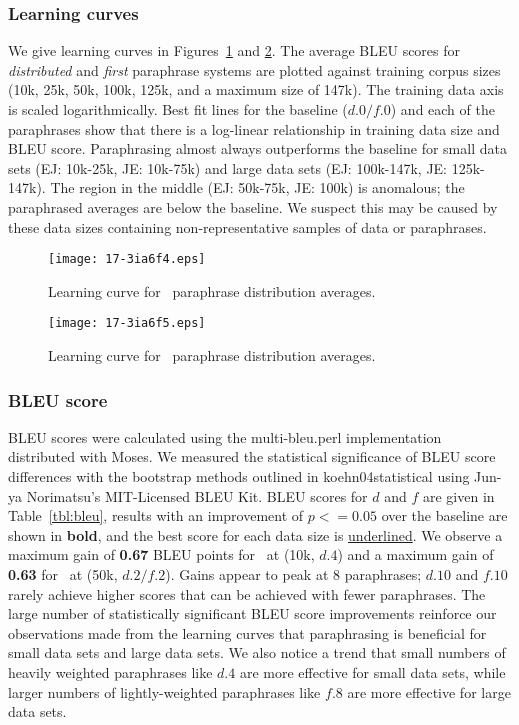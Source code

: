 \documentclass[english]{jnlp_1.4}
\newcommand{\citet}{}
\newcommand{\JE}{}
\newcommand{\EJ}{}
\begin{document}
\subsubsection{Learning curves}

We give learning curves in Figures~\ref{fig:curve-EJ} and
\ref{fig:curve-JE}.
The average BLEU scores for {\it distributed} and {\it first}
paraphrase systems are plotted against training corpus sizes (10k,
25k, 50k, 100k, 125k, and a maximum size of 147k). The training data
axis is scaled logarithmically. Best fit lines for the baseline
($d.0/f.0$) and each of the paraphrases show that there is a
log-linear relationship in training data size and BLEU
score. Paraphrasing almost always outperforms the baseline for small
data sets (EJ: 10k-25k, JE: 10k-75k) and large data sets (EJ:
100k-147k, JE: 125k-147k).  The region in the middle (EJ: 50k-75k, JE:
100k) is anomalous; the paraphrased averages are below the
baseline. We suspect this may be caused by these data sizes containing
non-representative samples of data or paraphrases.


\begin{figure}[p]
\begin{center}
\texttt{[image: 17-3ia6f4.eps]}
\end{center}
  \caption{Learning curve for \EJ\ paraphrase distribution averages.}
  \label{fig:curve-EJ}
\end{figure}
\begin{figure}[p]
\begin{center}
\texttt{[image: 17-3ia6f5.eps]}
\end{center}
  \caption{Learning curve for \JE\ paraphrase distribution averages.}
  \label{fig:curve-JE}
\end{figure}

\subsubsection{BLEU score}

    BLEU scores were calculated using the multi-bleu.perl
implementation distributed with Moses.  We measured the statistical
significance of BLEU score differences with the bootstrap methods
outlined in \citet{koehn04statistical} using Jun-ya Norimatsu's
MIT-Licensed BLEU Kit.
BLEU scores for $d$ and $f$ are given in Table~\ref{tbl:bleu}, results
with an improvement of $p <= 0.05$ over the baseline are shown in {\bf
  bold}, and the best score for each data size is \ul{underlined}. We
observe a maximum gain of {\bf 0.67} BLEU points for \EJ~at (10k,
$d.4$) and a maximum gain of {\bf 0.63} for \JE\ at (50k,
$d.2/f.2$). Gains appear to peak at 8 paraphrases; $d.10$ and $f.10$
rarely achieve higher scores that can be achieved with fewer
paraphrases. The large number of statistically significant BLEU score
improvements reinforce our observations made from the learning curves
that paraphrasing is beneficial for small data sets and large data
sets. We also notice a trend that small numbers of heavily weighted
paraphrases like $d.4$ are more effective for small data sets, while
larger numbers of lightly-weighted paraphrases like $f.8$ are more
effective for large data sets.
\end{document}
